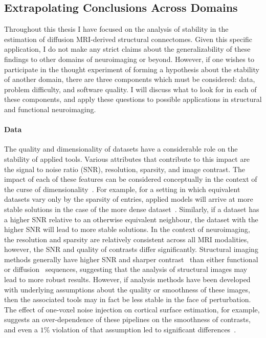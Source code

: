 \subsection{Extrapolating Conclusions Across Domains}

Throughout this thesis I have focused on the analysis of stability in the estimation of diffusion MRI-derived
structural connectomes. Given this specific application, I do not make any strict claims about the generalizability
of these findings to other domains of neuroimaging or beyond. However, if one wishes to participate in the thought
experiment of forming a hypothesis about the stability of another domain, there are three components which must
be considered: data, problem difficulty, and software quality. I will discuss what to look for in each of these
components, and apply these questions to possible applications in structural and functional neuroimaging.

\paragraph*{Data}
The quality and dimensionality of datasets have a considerable role on the stability of applied tools. Various
attributes that contribute to this impact are the signal to noise ratio (SNR), resolution, sparsity, and image
contrast. The impact of each of these features can be considered conceptually in the context of the curse of
dimensionality~\cite{friedman1997bias}. For example, for a setting in which equivalent datasets vary only by
the sparsity of entries, applied models will arrive at more stable solutions in the case of the more dense
dataset~\cite{geman1992neural}. Similarly, if a dataset has a higher SNR relative to an otherwise equivalent
neighbour, the dataset with the higher SNR will lead to more stable solutions. In the context of neuroimaging,
the resolution and sparsity are relatively consistent across all MRI modalities, however, the SNR and quality
of contrasts differ significantly. Structural imaging methods generally have higher SNR and sharper
contrast~\cite{bergamino2014review,chavhan2009principles} than either functional~\cite{logothetis2004nature} or
diffusion~\cite{thomason2011diffusion} sequences, suggesting that the analysis of structural images may lead to
more robust results. However, if analysis methods have been developed with underlying assumptions about the
quality or smoothness of these images, then the associated tools may in fact be less stable in the face of
perturbation. The effect of one-voxel noise injection on cortical surface estimation, for example, suggests an
over-dependence of these pipelines on the smoothness of contrasts, and even a $1\%$ violation of that assumption
led to significant differences~\cite{Lewis2017-ll}.

